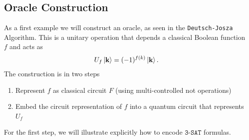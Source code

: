 \subsection{Oracle Construction}
As a first example we will construct an oracle, as seen in the \texttt{Deutsch-Josza} Algorithm. This is a unitary operation that depends a classical Boolean function $f$ and acts as
\begin{align}
    U_f\ket{\mathbf{k}} = (-1)^{f(k)} \ket{\mathbf{k}}.
\end{align}
The construction is in two steps
\begin{enumerate}
    \item Represent $f$ as classical circuit $F$ (using multi-controlled not operations)
    \item Embed the circuit representation of $f$ into a quantum circuit that represents $U_f$
\end{enumerate}
For the first step, we will illustrate explicitly how to encode $\texttt{3-SAT}$ formulas.

